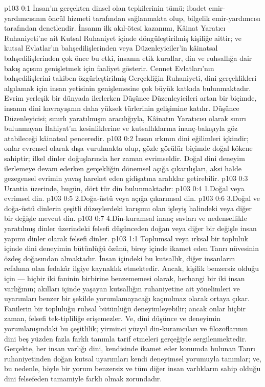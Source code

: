 \vs p103 0:1 İnsan’ın gerçekten dinsel olan tepkilerinin tümü; ibadet emir\hyp{}yardımcısının öncül hizmeti tarafından sağlanmakta olup, bilgelik emir\hyp{}yardımcısı tarafından denetlendir. İnsanın ilk akıl\hyp{}ötesi kazanımı, Kâinat Yaratıcı Ruhaniyeti’ne ait Kutsal Ruhaniyet içinde döngüleştirilmiş kişiliğe aittir; ve kutsal Evlatlar’ın bahşedilişlerinden veya Düzenleyiciler’in kâinatsal bahşedilişlerinden çok önce bu etki, insanın etik kurallar, din ve ruhsallığa dair bakış açısını genişletmek için faaliyet gösterir. Cennet Evlatları’nın bahşedilişlerini takiben özgürleştirilmiş Gerçekliğin Ruhaniyeti, dini gerçeklikleri algılamak için insan yetisinin genişlemesine çok büyük katkıda bulunmaktadır. Evrim yerleşik bir dünyada ilerlerken Düşünce Düzenleyicileri artan bir biçimde, insanın dini kavrayışının daha yüksek türlerinin gelişimine katılır. Düşünce Düzenleyicisi; sınırlı yaratılmışın aracılığıyla, Kâinatın Yaratıcısı olarak sınırı bulunmayan İlahiyat’ın kesinliklerine ve kutsallıklarına inanç\hyp{}bakışıyla göz atabileceği kâinatsal penceredir.
\vs p103 0:2 İnsan ırkının dini eğilimleri içkindir; onlar evrensel olarak dışa vurulmakta olup, gözle görülür biçimde doğal kökene sahiptir; ilkel dinler doğuşlarında her zaman evrimseldir. Doğal dini deneyim ilerlemeye devam ederken gerçekliğin dönemsel açığa çıkarılışları, aksi halde gezegensel evrimin yavaş hareket eden gidişatına aralıklar getirebilir.
\vs p103 0:3 Urantia üzerinde, bugün, dört tür din bulunmaktadır:
\vs p103 0:4 1.\bibnobreakspace Doğal veya evrimsel din.
\vs p103 0:5 2.\bibnobreakspace Doğa\hyp{}üstü veya açığa çıkarımsal din.
\vs p103 0:6 3.\bibnobreakspace Doğal ve doğa\hyp{}üstü dinlerin çeşitli düzeylerdeki karışımı olan işleyiş halindeki veya diğer bir değişle mevcut din.
\vs p103 0:7 4.\bibnobreakspace Din\hyp{}kuramsal inanç savları ve nedensellikle yaratılmış dinler üzerindeki felsefi düşünceden doğan veya diğer bir değişle insan yapımı dinler olarak felsefi dinler.
\vs p103 1:1 Toplumsal veya ırksal bir topluluk içinde dini deneyimin bütünlüğü özünü, birey içinde ikamet eden Tanrı nüvesinin özdeş doğasından almaktadır. İnsan içindeki bu kutsallık, diğer insanların refahına olan fedakâr ilgiye kaynaklık etmektedir. Ancak, kişilik benzersiz olduğu için --- hiçbir iki faninin birbirine benzememesi olarak, herhangi bir iki insan varlığının; akılları içinde yaşayan kutsallığın ruhaniyetine ait yönelimleri ve uyarımları benzer bir şekilde yorumlamayacağı kaçınılmaz olarak ortaya çıkar. Fanilerin bir topluluğu ruhsal bütünlüğü deneyimleyebilir; ancak onlar hiçbir zaman, felsefi tek\hyp{}tipliliğe erişemezler. Ve, dini düşünce ve deneyimin yorumlanışındaki bu çeşitlilik; yirminci yüzyıl din\hyp{}kuramcıları ve filozoflarının dini beş yüzden fazla farklı tanımla tarif etmeleri gerçeğiyle sergilenmektedir. Gerçekte, her insan varlığı dini, kendisinde ikamet eder konumda bulunan Tanrı ruhaniyetinden doğan kutsal uyarımları kendi deneyimsel yorumuyla tanımlar; ve, bu nedenle, böyle bir yorum benzersiz ve tüm diğer insan varlıkların sahip olduğu dini felsefeden tamamiyle farklı olmak zorundadır.
